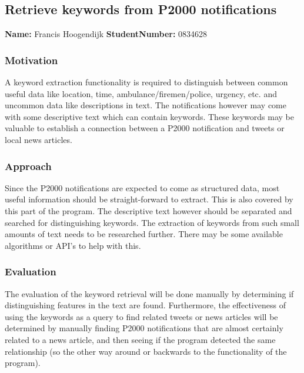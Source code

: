 \subsection{Retrieve keywords from P2000 notifications}
\textbf{Name:} Francis Hoogendijk  \indent \textbf{StudentNumber:} 0834628

\subsubsection*{Motivation}
A keyword extraction functionality is required to distinguish between common useful data like location, time, ambulance/firemen/police, urgency, etc. and uncommon data like descriptions in text. The notifications however may come with some descriptive text which can contain keywords. These keywords may be valuable to establish a connection between a P2000 notification and tweets or local news articles. 
 
\subsubsection*{Approach}
Since the P2000 notifications are expected to come as structured data, most useful information should be straight-forward to extract. This is also covered by this part of the program. The descriptive text however should be separated and searched for distinguishing keywords. The extraction of keywords from such small amounts of text needs to be researched further. There may be some available algorithms or API's to help with this. 

\subsubsection*{Evaluation }
The evaluation of the keyword retrieval will be done manually by determining if distinguishing features in the text are found. Furthermore, the effectiveness of using the keywords as a query to find related tweets or news articles will be determined by manually finding P2000 notifications that are almost certainly related to a news article, and then seeing if the program detected the same relationship (so the other way around or backwards to the functionality of the program). 